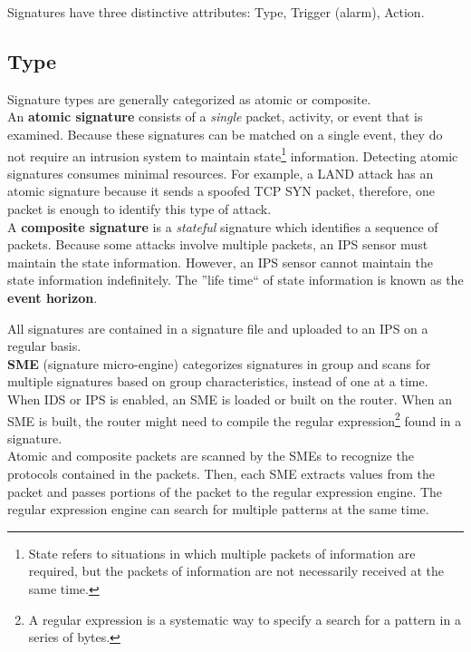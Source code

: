 Signatures have three distinctive attributes: Type, Trigger (alarm), Action.

\subsection{Type}

Signature types are generally categorized as atomic or composite.\\

An \textbf{atomic signature} consists of a \emph{single} packet, activity, or event that is examined. Because these signatures can be matched on a single event, they do not require an intrusion system to maintain state\footnote{State refers to situations in which multiple packets of information are required, but the packets of information are not necessarily received at the same time.} information. Detecting atomic signatures consumes minimal resources. For example, a LAND attack has an atomic signature because it sends a spoofed TCP SYN packet, therefore, one packet is enough to identify this type of attack.\\

A \textbf{composite signature} is a \emph{stateful} signature which identifies a sequence of packets. Because some attacks involve multiple packets, an IPS sensor must maintain the state information. However, an IPS sensor cannot maintain the state information indefinitely. The ''life time`` of state information is known as the \textbf{event horizon}.

All signatures are contained in a signature file and uploaded to an IPS on a regular basis.\\

\textbf{SME} (signature micro-engine) categorizes signatures in group and scans for multiple signatures based on group characteristics, instead of one at a time. When IDS or IPS is enabled, an SME is loaded or built on the router. When an SME is built, the router might need to compile the regular expression\footnote{A regular expression is a systematic way to specify a search for a pattern in a series of bytes.} found in a signature. \\

Atomic and composite packets are scanned by the SMEs to recognize the protocols contained in the packets. Then, each SME extracts values from the packet and passes portions of the packet to the regular expression engine. The regular expression engine can search for multiple patterns at the same time. 


